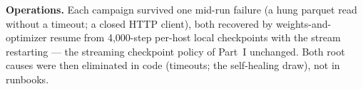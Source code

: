 \textbf{Operations.} Each campaign survived one mid-run failure
(a hung parquet read without a timeout; a closed HTTP client), both
recovered by weights-and-optimizer resume from 4{,}000-step per-host
local checkpoints with the stream restarting --- the streaming
checkpoint policy of Part~I unchanged. Both root causes were then
eliminated in code (timeouts; the self-healing draw), not in runbooks.
